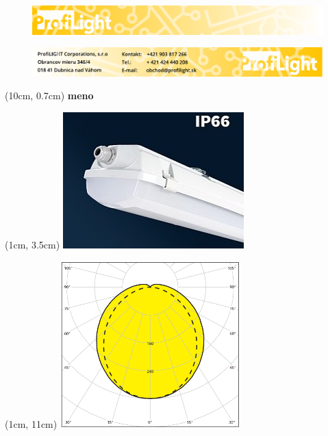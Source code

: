 \documentclass[a4paper, 12pt, onecolumn]{book}
\begin{document}
\thispagestyle{empty}										%



\begin{figure}[t!]
	\includegraphics[width=\paperwidth]{top.pdf}
\end{figure}


\begin{figure}[b!]
	\includegraphics[width=\paperwidth]{bottom.pdf}
\end{figure} 

\begin{textblock*}{10cm}(10cm, 0.7cm) 	%
	\centering
  {\fontsize{30}{0} \selectfont \textbf{ meno }}
\end{textblock*}

\begin{textblock*}{7cm}(1cm, 3.5cm)
	\includegraphics[width=7cm]{img.jpg}
\end{textblock*}

\begin{textblock*}{7cm}(1cm, 11cm)
	\includegraphics[width=7cm]{curve.PNG}
\end{textblock*}
\end{document}
